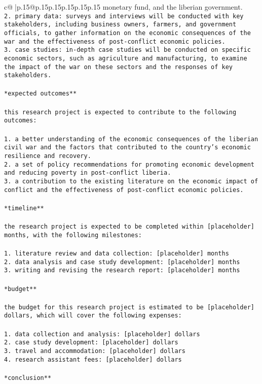 \documentclass{article}
\begin{document}
{\begin{supertabular}{c@{$\;$}|p{.15\linewidth}@{}p{.15\linewidth}p{.15\linewidth}p{.15\linewidth}p{.15\linewidth}p{.15\linewidth}}
{{{monetary fund, and the liberian government.\\ \tt 2. primary data: surveys and interviews will be conducted with key stakeholders, including business owners, farmers, and government officials, to gather information on the economic consequences of the war and the effectiveness of post-conflict economic policies.\\ \tt 3. case studies: in-depth case studies will be conducted on specific economic sectors, such as agriculture and manufacturing, to examine the impact of the war on these sectors and the responses of key stakeholders.\\ \tt \\ \tt **expected outcomes**\\ \tt \\ \tt this research project is expected to contribute to the following outcomes:\\ \tt \\ \tt 1. a better understanding of the economic consequences of the liberian civil war and the factors that contributed to the country's economic resilience and recovery.\\ \tt 2. a set of policy recommendations for promoting economic development and reducing poverty in post-conflict liberia.\\ \tt 3. a contribution to the existing literature on the economic impact of conflict and the effectiveness of post-conflict economic policies.\\ \tt \\ \tt **timeline**\\ \tt \\ \tt the research project is expected to be completed within [placeholder] months, with the following milestones:\\ \tt \\ \tt 1. literature review and data collection: [placeholder] months\\ \tt 2. data analysis and case study development: [placeholder] months\\ \tt 3. writing and revising the research report: [placeholder] months\\ \tt \\ \tt **budget**\\ \tt \\ \tt the budget for this research project is estimated to be [placeholder] dollars, which will cover the following expenses:\\ \tt \\ \tt 1. data collection and analysis: [placeholder] dollars\\ \tt 2. case study development: [placeholder] dollars\\ \tt 3. travel and accommodation: [placeholder] dollars\\ \tt 4. research assistant fees: [placeholder] dollars\\ \tt \\ \tt **conclusion**\\ \tt \\ }}}
\end{supertabular}}
\end{document}
